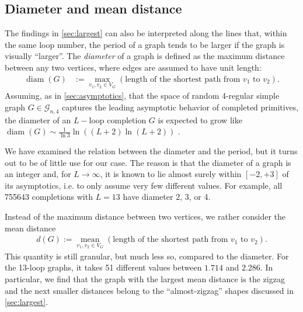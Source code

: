 \documentclass[12pt,a4paper]{article}
\newcommand{\diam}{\operatorname{diam}}
\renewcommand{\|}{\rule[-0.4ex]{0.2ex}{1.2em}}
\begin{document}
\subsection{Diameter and mean distance}\label{sec:diameter}


The findings in \cref{sec:largest} can also be interpreted along the lines that, within the same loop number, the period of a graph tends to be larger if the graph is visually  \enquote{larger}. 
The \emph{diameter} of a graph is defined as the maximum distance between any two vertices, where edges are assumed to have unit length:
\begin{align*}
\diam(G) &:= \max_{v_1,v_2\in V_G} \left( \text{length of the shortest path from $v_1$ to $v_2$} \right) .
\end{align*}
Assuming, as  in \cref{sec:asymptotics}, that the space of random 4-regular simple graph $G\in \mathcal G_{n,4}$ captures the leading asymptotic behavior of completed primitives, the diameter of an $L-$loop completion $G$ is expected to grow like $\diam(G)\sim \frac{1}{\ln 3} \ln \left( (L+2)\ln (L+2) \right) $  \cite{bollobas_diameter_1982}.


We have examined the relation between the diameter and the period, but it turns out to be of little use for our case. The reason is that  the diameter of a graph is an integer and, for $L \rightarrow \infty$, it is known to lie almost surely within $[-2,+3]$ of its asymptotics, i.e. to only assume very few different values. For example, all 755643 completions with $L=13$ have diameter 2, 3, or 4. 

Instead of the maximum distance between two vertices, we rather consider the mean distance
\begin{align*}
d (G) := \underset{v_1,v_2 \in V_G}{\operatorname{mean}}\left( \text{length of the shortest path from $v_1$ to $v_2$} \right) .
\end{align*}
This quantity is still granular, but much less so, compared to the diameter. For the 13-loop graphs, it takes 51 different values between $1.714$ and $2.286$. In particular, we find that the graph with the largest mean distance is the zigzag and the next smaller distances belong to the \enquote{almost-zigzag} shapes discussed in \cref{sec:largest}. 
\end{document}
